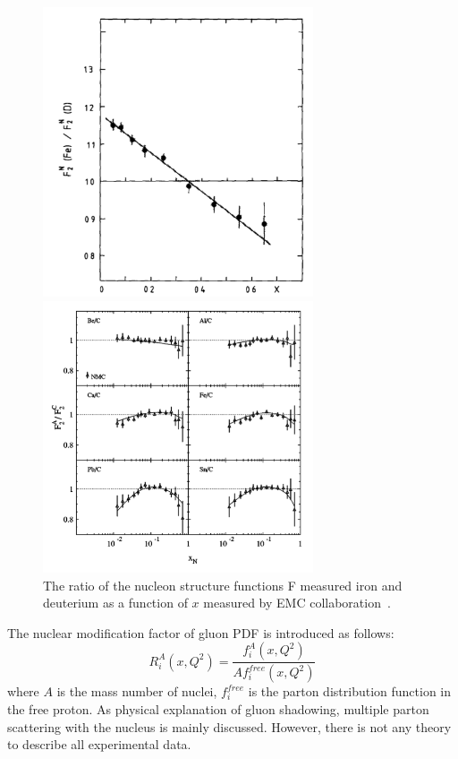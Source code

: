 \begin{figure}[!h]
  \begin{minipage}{0.5\hsize}
    \begin{center}
      \includegraphics[width=8cm]{chap2/figure/CNM/emc.png}
    \end{center}
  \end{minipage}
  \begin{minipage}{0.5\hsize}
    \begin{center}
      \includegraphics[width=8cm]{chap2/figure/CNM/stfunc.png}
    \end{center}
  \end{minipage}
  \caption{
    The ratio of the nucleon structure functions F measured iron and deuterium as a function of $x$ measured by EMC collaboration~\cite{bib_emc}.
  }
  \label{fig_2_stfunc}
\end{figure}

The nuclear modification factor of gluon PDF is introduced as follows:
\begin{equation}
  R^{A}_{i}(x, Q^{2}) = \frac{f^{A}_{i}(x, Q^{2})}{Af^{free}_{i}(x, Q^{2})}
\end{equation}
where $A$ is the mass number of nuclei, $f^{free}_{i}$ is the parton distribution function in the free proton.  
As physical explanation of gluon shadowing, multiple parton scattering with the nucleus is mainly discussed. 
However, there is not any theory to describe all experimental data. 

